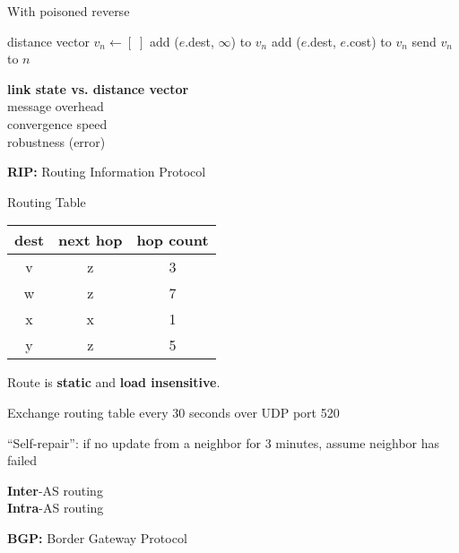 \begin{cf}{
	With poisoned reverse\\[1cm]
	\scriptsize
	\begin{algorithmic}
		\State distance vector $v_n \gets [\;]$
				  \State add ($e$.dest, $\infty$) to $v_n$
			  \Else
				  \State add ($e$.dest, $e$.cost)  to $v_n$
			  \EndIf
			\EndFor
			\State send $v_n$ to $n$
		\EndFor
	\end{algorithmic}
}
\end{cf}

\begin{cf}{
	\textbf{link state vs. distance vector}\\
	message overhead\\
	convergence speed\\
	robustness (error)\\
}
\end{cf}
\begin{cf}{
	\textbf{RIP:} Routing Information Protocol
}
\end{cf}
\begin{cf}{
	Routing Table
	\begin{tabular}{c|c|c}
	dest & next hop & hop count \\
	\hline
	v & z & 3\\
	w & z & 7\\
	x & x & 1\\
	y & z & 5\\
	\end{tabular}
}
\end{cf}
\begin{cf}{
	Route is \textbf{static} and \textbf{load insensitive}.
}
\end{cf}
\begin{cf}{
	Exchange routing table every 30 seconds over UDP port 520
}
\end{cf}
\begin{cf}{
	``Self-repair'': if no update from a neighbor for 3 minutes, assume neighbor has failed
}
\end{cf}

\begin{cf}{
\textbf{Inter}-AS routing\\
\textbf{Intra}-AS routing
}
\end{cf}

\begin{cf}{
	\textbf{BGP:} Border Gateway Protocol
}
\end{cf}


